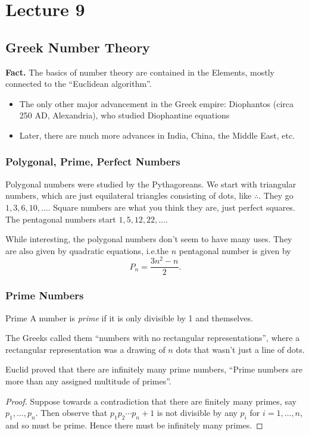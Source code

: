 \documentclass[class=article, crop=false]{standalone}
\begin{document}
  \section{Lecture 9}
  \subsection{Greek Number Theory}
  \textbf{Fact.} The basics of number theory are contained in the Elements, mostly connected to the ``Euclidean algorithm''.
  \begin{itemize}
    \item The only other major advancement in the Greek empire: Diophantos (circa 250 AD, Alexandria), who studied Diophantine equations
    \item Later, there are much more advances in India, China, the Middle East, etc.
  \end{itemize}
  \subsubsection{Polygonal, Prime, Perfect Numbers}
  Polygonal numbers were studied by the Pythagoreans. We start with triangular numbers, which are just equilateral triangles consisting of dots, like $\therefore$. They go $1, 3, 6, 10,\dotsc$. Square numbers are what you think they are, just perfect squares. The pentagonal numbers start $1, 5, 12, 22,\dotsc$.
  \begin{note}{}
    While interesting, the polygonal numbers don't seem to have many uses. They are also given by quadratic equations, i.e.the $n$ pentagonal number is given by
    \[
      P_n = \frac{3n^2 - n}{2}.
    \]
  \end{note}
  \subsubsection{Prime Numbers}
  \begin{definition}{Prime}
    A number is \emph{prime} if it is only divisible by 1 and themselves.
  \end{definition}
  \begin{note}{}
    The Greeks called them ``numbers with no rectangular representations'', where a rectangular representation was a drawing of $n$ dots that wasn't just a line of dots.
  \end{note}
  Euclid proved that there are infinitely many prime numbers, ``Prime numbers are more than any assigned multitude of primes''.
  \begin{proof}
    Suppose towards a contradiction that there are finitely many primes, say $p_1,\dotsc,p_n$. Then observe that $p_1p_2\dotsb p_n + 1$ is not divisible by any $p_i$ for $i = 1,\dotsc,n$, and so must be prime. Hence there must be infinitely many primes.
  \end{proof}
\end{document}
